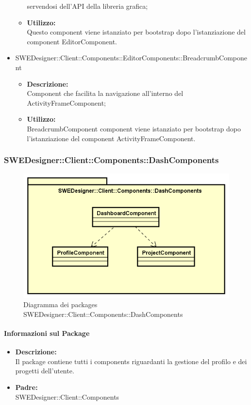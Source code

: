 \begin{itemize}
\begin{itemize}
				servendosi dell'API della libreria grafica;
				\item \textbf{Utilizzo: }\\
				Questo component viene istanziato per bootstrap dopo l'istanziazione
				del component EditorComponent.
			\end{itemize}
			\item SWEDesigner::Client::Components::EditorComponents::BreadcrumbComponent
			\begin{itemize}
				\item \textbf{Descrizione: }\\
				Component che facilita la navigazione all'interno del ActivityFrameComponent;
				\item \textbf{Utilizzo: }\\
				BreadcrumbComponent component viene istanziato per bootstrap dopo l'istanziazione
				del component ActivityFrameComponent.
			\end{itemize}
		\end{itemize}

		\subsubsection{SWEDesigner::Client::Components::DashComponents}
		 \begin{figure}[h!]
		\centering
		\includegraphics[scale=0.4]{Disegnetti/SWEDesigner__Client__Components__DashComponents.png}
		\caption{Diagramma dei packages SWEDesigner::Client::Components::DashComponents}
 		\end{figure}
		\paragraph{Informazioni sul Package}
		\begin{itemize}
			\item \textbf{Descrizione: }\\
			Il package contiene tutti i components riguardanti la gestione del profilo
			e dei progetti dell'utente.
			\item \textbf{Padre: }\\ SWEDesigner::Client::Components
		\end{itemize}

